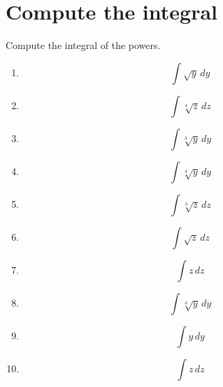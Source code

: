 \documentclass{article}
\begin{document}
        \section{Compute the integral}
        Compute the integral of the powers.
        \begin{multicols}{1}
        \begin{enumerate}
        \item $$\int \sqrt{y}\, dy$$
\item $$\int \sqrt[4]{z}\, dz$$
\item $$\int \sqrt[3]{y}\, dy$$
\item $$\int \sqrt[4]{y}\, dy$$
\item $$\int \sqrt[3]{z}\, dz$$
\item $$\int \sqrt{z}\, dz$$
\item $$\int z\, dz$$
\item $$\int \sqrt[4]{y}\, dy$$
\item $$\int y\, dy$$
\item $$\int z\, dz$$
        \end{enumerate}
        \end{multicols}
        

    
\end{document}
